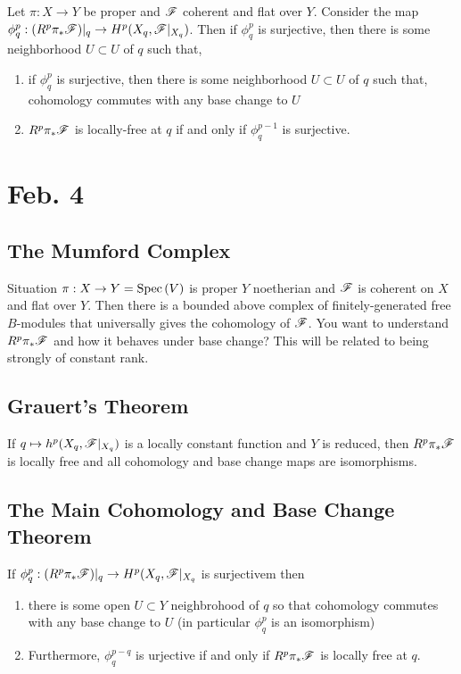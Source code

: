 \documentclass[12pt]{article}
\begin{document}
\begin{thm}
Let $\pi : X \to Y$ be proper and $\mathscr{F}$ coherent and flat over $Y$.
Consider the map $\phi^p_q : (R^p \pi_* \mathscr{F})|_q \to H^p(X_q, \mathscr{F} |_{X_q})$. Then if $\phi_q^p$ is surjective, then there is some neighborhood $U \subset U$ of $q$ such that,
\begin{enumerate}
\item if $\phi_q^p$ is surjective, then there is some neighborhood $U \subset U$ of $q$ such that, cohomology commutes with any base change to $U$
\item $R^p \pi_* \mathscr{F}$ is locally-free at $q$ if and only if $\phi^{p-1}_q$ is surjective.
\end{enumerate}
\end{thm}

\section{Feb. 4}

\subsection{The Mumford Complex}

Situation $\pi : X \to Y = \mathrm{Spec}\left( V \right)$ is proper $Y$ noetherian and $\mathscr{F}$ is coherent on $X$ and flat over $Y$. Then there is a bounded above complex of finitely-generated free $B$-modules that universally gives the cohomology of $\mathscr{F}$. You want to understand $R^p \pi_* \mathscr{F}$ and how it behaves under base change? This will be related to being strongly of constant rank. 

\subsection{Grauert's Theorem}

If $q \mapsto h^p(X_q, \mathscr{F}|_{X_q})$ is a locally constant function and $Y$ is reduced, then $R^p \pi_* \mathscr{F}$ is locally free and all cohomology and base change maps are isomorphisms.

\subsection{The Main Cohomology and Base Change Theorem}

If $\phi^p_q : (R^p \pi_* \mathscr{F})|_q \to H^p(X_q, \mathscr{F}|_{X_q}$ is surjectivem then
\begin{enumerate}
\item there is some open $U \subset Y$ neighbrohood of $q$ so that cohomology commutes with any base change to $U$ (in particular $\phi^p_q$ is an isomorphism)
\item Furthermore, $\phi^{p-q}_q$ is urjective if and only if $R^p \pi_* \mathscr{F}$ is locally free at $q$. 
\end{enumerate}
\end{document}
